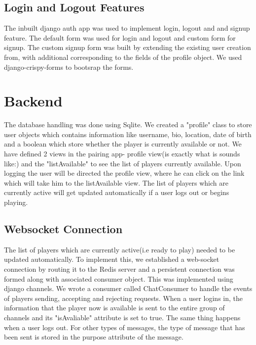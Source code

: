 \documentclass[titlepage]{article}
\begin{document}
\subsection{Login and Logout Features}
The inbuilt django auth app was used to implement login, logout and and signup feature. The default form was used for login and logout and custom form for signup. The custom signup form was built by extending the existing user creation from, with additional corresponding to the fields of the profile object. We used django-crispy-forms to bootsrap the forms. 
\section{Backend}
 The database handling was done using Sqlite. We created a "profile" class to store user objects which contains information like username, bio, location, date of birth and a boolean which store whether the player is currently available or not. We have defined 2 views in the pairing app- profile view(is exactly what is sounds like:) and the "listAvailable" to see the list of players currently available. Upon logging the user will be directed the profile view, where he can click on the link which will take him to the listAvailable view. The list of players which are currently active will get updated automatically if a user logs out or begins playing. 
\subsection{Websocket Connection}
The list of players which are currently active(i.e ready to play) needed to be updated automatically. To implement this, we established a web-socket connection by routing it to the Redis server and a persistent connection was formed along with associated consumer object. This was implemented using django channels. We wrote a consumer called ChatConsumer to handle the events of players sending, accepting and rejecting requests. When a user logins in, the information that the player now is available is sent to the entire group of channels and its "isAvaliable" attribute is set to true. The same thing happens when a user logs out. For other types of messages, the type of message that has been sent is stored in the purpose attribute of the message. 
\end{document}

